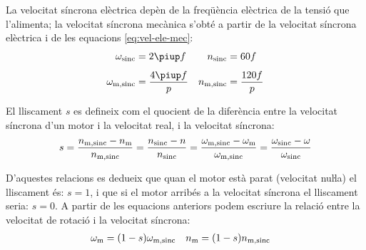 La velocitat síncrona elèctrica depèn de la freqüència elèctrica de la tensió que l'alimenta; la velocitat síncrona mecànica s'obté a partir de la velocitat síncrona elèctrica i de  les equacions \eqref{eq:vel-ele-mec}:
\begin{subequations}\index{motors d'inducció!velocitat síncrona}
\begin{align}
    \omega\ped{sinc} &= 2 \piup f & n\ped{sinc} &= 60 f \\[1ex]
    \omega\ped{m,sinc} &= \frac{4 \piup f}{p} & n\ped{m,sinc} &= \frac{120 f}{p}\label{eq:vel-mec-sinc}
\end{align}
\end{subequations}

El lliscament $s$ es defineix com el quocient de la diferència entre la velocitat síncrona d'un motor i la velocitat real, i la velocitat síncrona:
\begin{equation}\label{eq:lliscament}\index{lliscament}
    s = \frac{n\ped{m,sinc}-n\ped{m}}{n\ped{m,sinc}} =
    \frac{n\ped{sinc}-n}{n\ped{sinc}} =
    \frac{\omega\ped{m,sinc}-\omega\ped{m}}{\omega\ped{m,sinc}} =
    \frac{\omega\ped{sinc}-\omega}{\omega\ped{sinc}}
\end{equation}

D'aquestes relacions es dedueix que quan el motor està parat (velocitat nuŀla) el lliscament és: $s=1$, i que si el motor arribés a la velocitat síncrona el lliscament seria: $s=0$. A partir de les equacions anteriors podem escriure la relació entre la velocitat de rotació i la velocitat síncrona:
\begin{align}
    \omega_\mathrm{m} &= (1-s) \omega_\mathrm{m,sinc} & n_\mathrm{m} &= (1-s) n_\mathrm{m,sinc} \label{eq:wm-wsinc}
\end{align}



